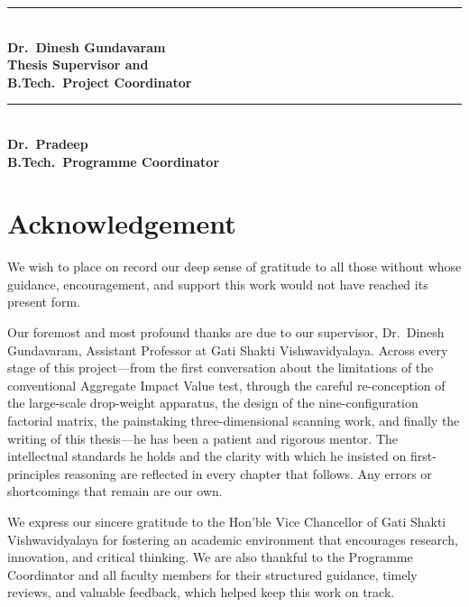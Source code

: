 \vspace{1.6cm}
\noindent
\begin{minipage}[t]{0.48\textwidth}
\centering
\rule{5.5cm}{0.4pt}\\[2pt]
\textbf{Dr.\ Dinesh Gundavaram}\\
\textbf{Thesis Supervisor and}\\\textbf{B.Tech.\ Project Coordinator}
\end{minipage}\hfill
\begin{minipage}[t]{0.48\textwidth}
\centering
\rule{5.5cm}{0.4pt}\\[2pt]
\textbf{Dr.\ Pradeep}\\
\textbf{B.Tech.\ Programme Coordinator}
\end{minipage}

\chapter*{Acknowledgement}

We wish to place on record our deep sense of gratitude to all those without whose guidance, encouragement, and support this work would not have reached its present form.

Our foremost and most profound thanks are due to our supervisor, Dr.\ Dinesh Gundavaram, Assistant Professor at Gati Shakti Vishwavidyalaya. Across every stage of this project---from the first conversation about the limitations of the conventional Aggregate Impact Value test, through the careful re-conception of the large-scale drop-weight apparatus, the design of the nine-configuration factorial matrix, the painstaking three-dimensional scanning work, and finally the writing of this thesis---he has been a patient and rigorous mentor. The intellectual standards he holds and the clarity with which he insisted on first-principles reasoning are reflected in every chapter that follows. Any errors or shortcomings that remain are our own.

We express our sincere gratitude to the Hon'ble Vice Chancellor of Gati Shakti Vishwavidyalaya for fostering an academic environment that encourages research, innovation, and critical thinking. We are also thankful to the Programme Coordinator and all faculty members for their structured guidance, timely reviews, and valuable feedback, which helped keep this work on track.

